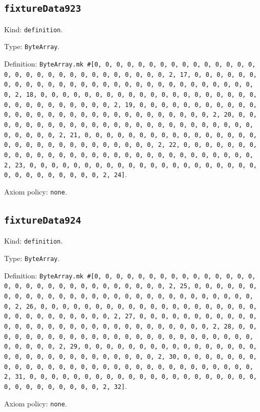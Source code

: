 \documentclass[11pt]{article}
\begin{document}
\subsection*{\texttt{fixtureData923}}
\noindent Kind: \texttt{definition}.\par
\noindent Type: \texttt{ByteArray}.\par
\noindent Definition: \texttt{ByteArray.mk \#[0, 0, 0, 0, 0, 0, 0, 0, 0, 0, 0, 0, 0, 0, 0, 0, 0, 0, 0, 0, 0, 0, 0, 0, 0, 0, 0, 0, 0, 0, 2, 17, 0, 0, 0, 0, 0, 0, 0, 0, 0, 0, 0, 0, 0, 0, 0, 0, 0, 0, 0, 0, 0, 0, 0, 0, 0, 0, 0, 0, 0, 0, 2, 18, 0, 0, 0, 0, 0, 0, 0, 0, 0, 0, 0, 0, 0, 0, 0, 0, 0, 0, 0, 0, 0, 0, 0, 0, 0, 0, 0, 0, 0, 0, 2, 19, 0, 0, 0, 0, 0, 0, 0, 0, 0, 0, 0, 0, 0, 0, 0, 0, 0, 0, 0, 0, 0, 0, 0, 0, 0, 0, 0, 0, 0, 0, 2, 20, 0, 0, 0, 0, 0, 0, 0, 0, 0, 0, 0, 0, 0, 0, 0, 0, 0, 0, 0, 0, 0, 0, 0, 0, 0, 0, 0, 0, 0, 0, 2, 21, 0, 0, 0, 0, 0, 0, 0, 0, 0, 0, 0, 0, 0, 0, 0, 0, 0, 0, 0, 0, 0, 0, 0, 0, 0, 0, 0, 0, 0, 0, 2, 22, 0, 0, 0, 0, 0, 0, 0, 0, 0, 0, 0, 0, 0, 0, 0, 0, 0, 0, 0, 0, 0, 0, 0, 0, 0, 0, 0, 0, 0, 0, 2, 23, 0, 0, 0, 0, 0, 0, 0, 0, 0, 0, 0, 0, 0, 0, 0, 0, 0, 0, 0, 0, 0, 0, 0, 0, 0, 0, 0, 0, 0, 0, 2, 24]}.\par
\noindent Axiom policy: \texttt{none}.\par
\subsection*{\texttt{fixtureData924}}
\noindent Kind: \texttt{definition}.\par
\noindent Type: \texttt{ByteArray}.\par
\noindent Definition: \texttt{ByteArray.mk \#[0, 0, 0, 0, 0, 0, 0, 0, 0, 0, 0, 0, 0, 0, 0, 0, 0, 0, 0, 0, 0, 0, 0, 0, 0, 0, 0, 0, 0, 0, 2, 25, 0, 0, 0, 0, 0, 0, 0, 0, 0, 0, 0, 0, 0, 0, 0, 0, 0, 0, 0, 0, 0, 0, 0, 0, 0, 0, 0, 0, 0, 0, 2, 26, 0, 0, 0, 0, 0, 0, 0, 0, 0, 0, 0, 0, 0, 0, 0, 0, 0, 0, 0, 0, 0, 0, 0, 0, 0, 0, 0, 0, 0, 0, 2, 27, 0, 0, 0, 0, 0, 0, 0, 0, 0, 0, 0, 0, 0, 0, 0, 0, 0, 0, 0, 0, 0, 0, 0, 0, 0, 0, 0, 0, 0, 0, 2, 28, 0, 0, 0, 0, 0, 0, 0, 0, 0, 0, 0, 0, 0, 0, 0, 0, 0, 0, 0, 0, 0, 0, 0, 0, 0, 0, 0, 0, 0, 0, 2, 29, 0, 0, 0, 0, 0, 0, 0, 0, 0, 0, 0, 0, 0, 0, 0, 0, 0, 0, 0, 0, 0, 0, 0, 0, 0, 0, 0, 0, 0, 0, 2, 30, 0, 0, 0, 0, 0, 0, 0, 0, 0, 0, 0, 0, 0, 0, 0, 0, 0, 0, 0, 0, 0, 0, 0, 0, 0, 0, 0, 0, 0, 0, 2, 31, 0, 0, 0, 0, 0, 0, 0, 0, 0, 0, 0, 0, 0, 0, 0, 0, 0, 0, 0, 0, 0, 0, 0, 0, 0, 0, 0, 0, 0, 0, 2, 32]}.\par
\noindent Axiom policy: \texttt{none}.\par
\end{document}
